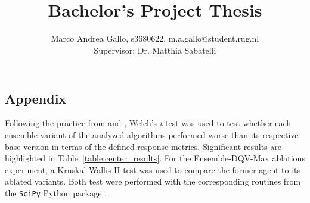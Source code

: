 \documentclass[10pt,a4paper,twocolumn]{article}
\title{\vspace{-0.5in}{\bfseries\scshape
    Using ensembles to address Bootstrapping Errors in Offline
    Reinforcement Learning
    } \\
    \vspace{1ex}
    \normalsize{Bachelor's Project Thesis}\vspace{-2ex}
}
\author{
    \normalsize{Marco Andrea Gallo, s3680622, m.a.gallo@student.rug.nl} \\
    \normalsize{Supervisor: Dr. Matthia Sabatelli}
}
\date{\vspace{-5ex}}
\begin{document}
\twocolumn[
  \maketitle
  \begin{@twocolumnfalse}
    
  \end{@twocolumnfalse}
]

\thispagestyle{firststyle}









\clearpage

\begin{appendices}
  \section{Appendix}
  Following the practice from \citet{DBLP:journals/corr/abs-1709-06560}
  and \citet{https://doi.org/10.48550/arxiv.1904.06979}, Welch's
  \textit{t}-test was used to test whether each ensemble variant of the
  analyzed algorithms performed worse than its respective base version
  in terms of the defined response metrics. Significant results are
  highlighted in Table~\ref{table:center_results}.
  For the Ensemble-DQV-Max ablations experiment, a Kruskal-Wallis H-test
  was used to compare the former agent to its ablated variants.
  Both test were performed with the corresponding routines from the
  \texttt{SciPy} Python package \citep{2020SciPy-NMeth}.

  
  \newpage
\end{appendices}
\end{document}
